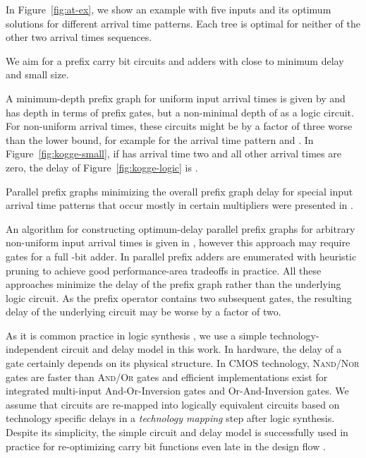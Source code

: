 \documentclass[11pt,final,microtype]{scrartcl}
\theoremstyle{plain}
\theoremstyle{definition}
\theoremstyle{remark}
\begin{document}
In Figure~\ref{fig:at-ex}, we show an example with five inputs and its
optimum solutions for different arrival time patterns. Each tree is
optimal for neither of the other two arrival times sequences.

We aim for a prefix carry bit circuits and adders with close to minimum delay
and small size. 

A minimum-depth prefix graph for uniform input arrival times is given
by \cite{kogge-stone, ladner} and has depth  in
terms of prefix gates, but a non-minimal depth of  as a logic circuit. For non-uniform arrival times, these
circuits might be by a factor of three worse than the lower bound, for
example for the arrival time pattern  and . In Figure~\ref{fig:kogge-small}, if  has arrival time
two and all other arrival times are zero, the delay of
Figure~\ref{fig:kogge-logic} is . 


Parallel prefix graphs minimizing the overall prefix graph delay for
special input arrival time patterns that occur mostly in certain
multipliers were presented in \cite{zimmermann,okl}.

An algorithm for constructing optimum-delay parallel prefix graphs for
arbitrary non-uniform input arrival times is given in \cite{choi},
however this approach may require  gates for a full
-bit adder.  In \cite{roy} parallel prefix adders are enumerated
with heuristic pruning to achieve good performance-area tradeoffs in
practice.  All these approaches minimize the delay of the prefix graph
rather than the underlying logic circuit.  As the prefix operator
contains two subsequent gates, the resulting delay of the underlying
circuit may be worse by a factor of two.

As it is common practice in logic synthesis
\cite{kogge-stone,ladner,bonnlogic,roy}, we use a simple technology-independent circuit and delay model in this work.  In
hardware, the delay of a gate certainly depends on its physical
structure.
In CMOS technology, \textsc{Nand}/\textsc{Nor} gates are faster than
\textsc{And}/\textsc{Or} gates and efficient implementations exist for
integrated multi-input {\sc And-Or}-Inversion gates and {\sc Or-And}-Inversion
gates. 
We assume that circuits are re-mapped into logically equivalent circuits
based on technology specific delays in a {\it technology mapping} step
\cite{keutzer88,Chatterjee+techmap2006} after logic synthesis.
Despite its simplicity, the simple circuit and delay model is
successfully used in practice for re-optimizing carry bit functions
even late in the design flow \cite{bonnlogic}.
\end{document}
